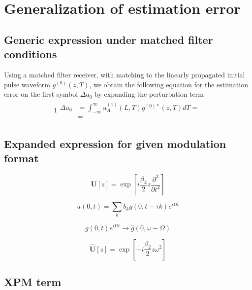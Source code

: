 \documentclass[10pt,journal]{IEEEtran}
\begin{document}
\section{Generalization of estimation error}
\subsection{Generic expression under matched filter conditions}
Using a matched filter receiver, with matching to the linearly propagated initial pulse waveform $g^{(0)}(z, T)$, we obtain the following equation for the estimation error on the first symbol $\Delta a_0$ by expanding the perturbation term
\begin{alignat}{1}
 \begin{aligned}
 \Delta a_0 &= \int_{-\infty}^{\infty} u_A^{(1)}(L, T) g^{(0)*}(z, T) dT =\\
 &=
 \end{aligned}
\end{alignat} \label{eq:matched}
\subsection{Expanded expression for given modulation format}
\begin{equation}
	     \mathbf{U}[z]=\exp \left[i \frac{\beta_{2}}{2} z \frac{\partial^{2}}{\partial t^{2}} \right]
\end{equation}

\begin{equation}
	      u(0, t)=\sum_{k} b_{k} g(0, t - \tau k) e^{i \Omega t}
\end{equation}

\begin{equation}
	   	g(0, t) e^{i \Omega t} \rightarrow \hat{g}(0, \omega-\Omega)
\end{equation}

\begin{equation}
	     \hat{\mathbf{U}}[z]=\exp \left[- i \frac{\beta_{2}}{2} z \omega^2 \right]
\end{equation}

\subsection{XPM term}



\hrulefill
\printbibliography
\end{document}
